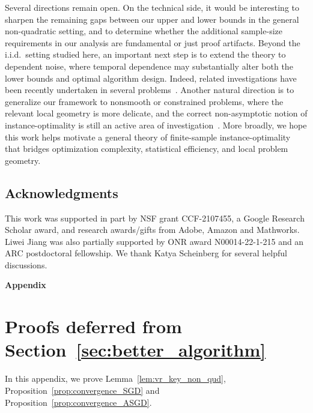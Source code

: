 \documentclass[11pt,twoside]{article}
\numberwithin{equation}{section}
\newcommand{\1}{\mathbf{1}}
\theoremstyle{remark}
\theoremstyle{plain}
\begin{document}
Several directions remain open. On the technical side, it would be interesting to sharpen the remaining gaps between our upper and lower bounds in the general non-quadratic setting, and to determine whether the additional sample-size requirements in our analysis are fundamental or just proof artifacts. Beyond the i.i.d.\ setting studied here, an important next step is to extend the theory to dependent noise, where temporal dependence may substantially alter both the lower bounds and optimal algorithm design. Indeed, related investigations have been recently undertaken in several problems~\cite{mou2022optimal1, li2023accelerated,wu2025uncertainty,nakul2026multiscale}. Another natural direction is to generalize our framework to nonsmooth or constrained problems, where the relevant local geometry is more delicate, and the correct non-asymptotic notion of instance-optimality is still an active area of investigation~\cite{cheng2025geometrycomputationoptimalitystochastic}. More broadly, we hope this work helps motivate a general theory of finite-sample instance-optimality that bridges optimization complexity, statistical efficiency, and local problem geometry.



\subsection*{Acknowledgments}

This work was supported in part by NSF grant CCF-2107455, a Google Research Scholar award, and research awards/gifts from Adobe, Amazon and Mathworks. Liwei Jiang was also partially supported by ONR award N00014-22-1-215 and an ARC postdoctoral fellowship. We thank Katya Scheinberg for several helpful discussions.

\small



\normalsize
\newpage

\begin{center}
\LARGE{\textbf{Appendix}}
\end{center}
\appendix
\section{Proofs deferred from  Section~\ref{sec:better_algorithm}}
In this appendix, we prove Lemma~\ref{lem:vr_key_non_qud}, Proposition~\ref{prop:convergence_SGD} and Proposition~\ref{prop:convergence_ASGD}.
\end{document}
